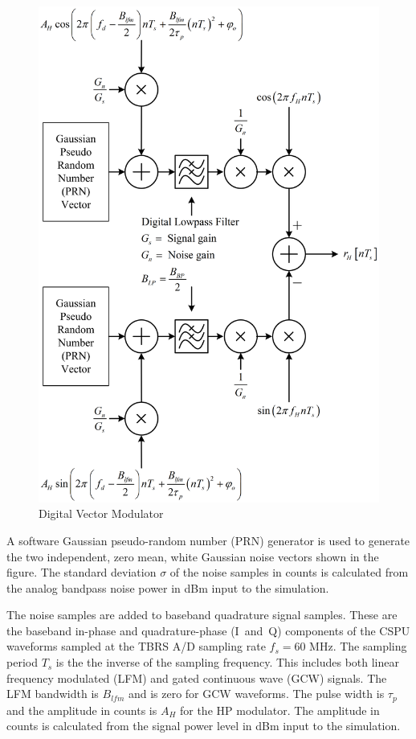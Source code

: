 \documentclass[12pt,english]{article}
\begin{document}
\begin{figure}[htbp]
  \noindent \begin{centering}
  \includegraphics{VectorModulator.png}\medskip{}
  \caption{Digital Vector Modulator}
  \label{fig:VectorModulator}
  \par \end{centering}
\end{figure}

A software Gaussian pseudo-random number (PRN) generator is used to
generate the two independent, zero mean, white Gaussian noise vectors
shown in the figure. The standard deviation $\sigma$ of the noise
samples in counts is calculated from the analog bandpass noise power
in dBm input to the simulation.

The noise samples are added to baseband quadrature signal samples.
These are the baseband in-phase and quadrature-phase (I~and~Q)
components of the CSPU waveforms sampled at the TBRS A/D sampling rate
$f_s = 60$ MHz. The sampling period $T_s$ is the the inverse of the
sampling frequency. This includes both linear frequency modulated
(LFM) and gated continuous wave (GCW) signals. The LFM bandwidth is
$B_{lfm}$ and is zero for GCW waveforms.  The pulse width is $\tau_p$
and the amplitude in counts is $A_H$ for the HP modulator. The
amplitude in counts is calculated from the signal power level in dBm
input to the simulation.
\end{document}
